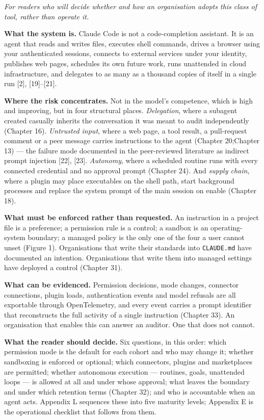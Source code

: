 \documentclass[11pt,a4paper,twoside,openany]{book}
\begin{document}
\emph{For readers who will decide whether and how an organisation adopts this class of tool, rather than operate it.}


\textbf{What the system is.} Claude Code is not a code-completion assistant. It is an agent that reads and writes files, executes shell commands, drives a browser using your authenticated sessions, connects to external services under your identity, publishes web pages, schedules its own future work, runs unattended in cloud infrastructure, and delegates to as many as a thousand copies of itself in a single run [2], [19]–[21].


\textbf{Where the risk concentrates.} Not in the model's competence, which is high and improving, but in four structural places. \emph{Delegation}, where a subagent created casually inherits the conversation it was meant to audit independently (Chapter 16). \emph{Untrusted input}, where a web page, a tool result, a pull-request comment or a peer message carries instructions to the agent (Chapter 20;Chapter 13) — the failure mode documented in the peer-reviewed literature as indirect prompt injection [22], [23]. \emph{Autonomy}, where a scheduled routine runs with every connected credential and no approval prompt (Chapter 24). And \emph{supply chain}, where a plugin may place executables on the shell path, start background processes and replace the system prompt of the main session on enable (Chapter 18).


\textbf{What must be enforced rather than requested.} An instruction in a project file is a preference; a permission rule is a control; a sandbox is an operating-system boundary; a managed policy is the only one of the four a user cannot unset (Figure 1). Organisations that write their standards into \texttt{CLAUDE.\allowbreak{}md} have documented an intention. Organisations that write them into managed settings have deployed a control (Chapter 31).


\textbf{What can be evidenced.} Permission decisions, mode changes, connector connections, plugin loads, authentication events and model refusals are all exportable through OpenTelemetry, and every event carries a prompt identifier that reconstructs the full activity of a single instruction (Chapter 33). An organisation that enables this can answer an auditor. One that does not cannot.


\textbf{What the reader should decide.} Six questions, in this order: which permission mode is the default for each cohort and who may change it; whether sandboxing is enforced or optional; which connectors, plugins and marketplaces are permitted; whether autonomous execution — routines, goals, unattended loops — is allowed at all and under whose approval; what leaves the boundary and under which retention terms (Chapter 32); and who is accountable when an agent acts. Appendix L sequences these into five maturity levels; Appendix E is the operational checklist that follows from them.
\end{document}
